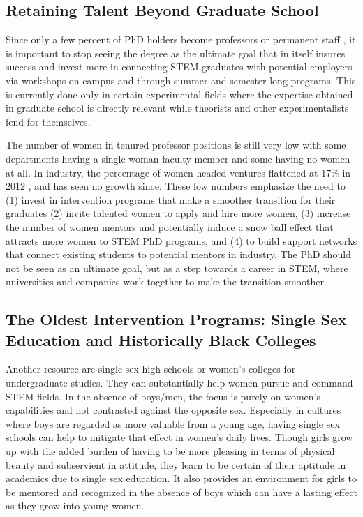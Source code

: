 \documentclass[utf8]{frontiersSCNS} %
\begin{document}
\subsection{Retaining Talent Beyond Graduate School}
\label{6.3}
Since only a few percent of PhD holders become professors or permanent staff \citep{larson2014too}, it is important to stop seeing the degree as the ultimate goal that in itself insures success and invest more in connecting STEM graduates with potential employers via workshops on campus and through summer and semester-long programs. This is currently done only in certain experimental fields where the expertise obtained in graduate school is directly relevant while theorists and other experimentalists fend for themselves. 

The number of women in tenured professor positions is still very low with some departments having a single woman faculty member and some having no women at all. In industry, the percentage of women-headed ventures flattened at 17\% in 2012 \citep{teare20172017}, and has seen no growth since. These low numbers emphasize the need to (1) invest in intervention programs that make a smoother transition for their graduates (2) invite talented women to apply and hire more women, (3) increase the number of women mentors and potentially induce a snow ball effect that attracts more women to STEM PhD programs, and (4) to build support networks that connect existing students to potential mentors in industry. The PhD should not be seen as an ultimate goal, but as a step towards a career in STEM, where universities and companies work together to make the transition smoother.



\subsection{The Oldest Intervention Programs: Single Sex Education and Historically Black Colleges}
\label{Sec7}
Another resource are single sex high schools or women’s colleges for undergraduate studies. They can substantially help women pursue and command STEM fields. In the absence of boys/men, the focus is purely on women’s capabilities and not contrasted against the opposite sex. Especially in cultures where boys are regarded as more valuable from a young age, having single sex schools can help to mitigate that effect in women's daily lives. Though girls grow up with the added burden of having to be more pleasing in terms of physical beauty and subservient in attitude, they learn to be certain of their aptitude in academics due to single sex education. It also provides an environment for girls to be mentored and recognized in the absence of boys which can have a lasting effect as they grow into young women.
\end{document}
